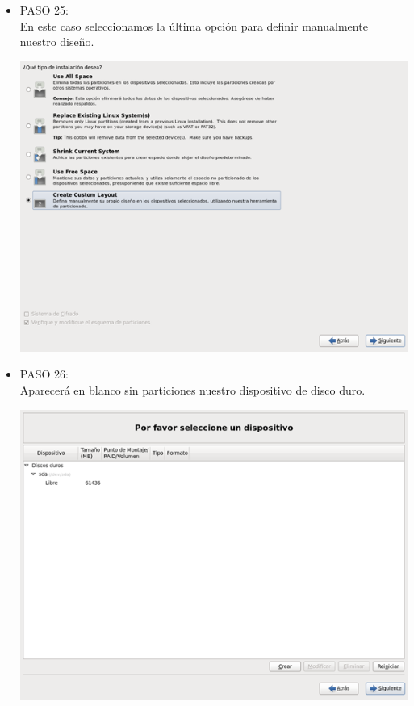 \begin{itemize}
\item PASO 25:
\\En este caso seleccionamos la última opción para definir manualmente nuestro diseño.
		\begin{center}
		\includegraphics[width=13cm]{./Imagenes/25}
		\end{center}
	
	\end{itemize} 

\begin{itemize}
\item PASO 26:
\\Aparecerá  en blanco sin particiones nuestro dispositivo de disco duro.
		\begin{center}
		\includegraphics[width=13cm]{./Imagenes/26}
		\end{center}
	\\\
	\end{itemize} 

